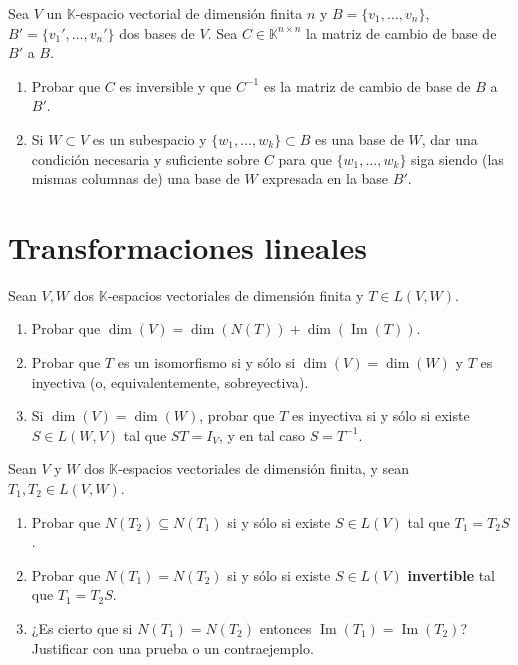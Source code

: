 \documentclass{article}
\newcommand{\K}{\mathbb{K}}
\DeclareMathOperator{\Ima}{Im}
\DeclareMathOperator{\dimm}{dim}
\theoremstyle{plain}
\theoremstyle{definition}
\theoremstyle{remark}
\newenvironment{ejercicio}[1]{\begin{trivlist}
\item[\hskip \labelsep {\bfseries Ejercicio}\hskip \labelsep {\bfseries #1.}]}{\end{trivlist}}
\begin{document}
\begin{ejercicio}{3}
    Sea \(V\) un \(\K\)-espacio vectorial de dimensión finita \(n\) y \(B = \{v_1,\ldots,v_n\}\), \(B' = \{v_1',\ldots,v_n'\}\) dos bases de \(V\). Sea \(C \in \K^{n\times n}\) la matriz de cambio de base de \(B'\) a \(B\).
    \begin{enumerate}
        \item Probar que \(C\) es inversible y que \(C^{-1}\) es la matriz de cambio de base de \(B\) a \(B'\).
        \item Si \(W \subset V\) es un subespacio y \(\{w_1,\ldots,w_k\} \subset B\) es una base de \(W\), dar una condición necesaria y suficiente sobre \(C\) para que \(\{w_1,\ldots,w_k\}\) siga siendo (las mismas columnas de) una base de \(W\) expresada en la base \(B'\).
    \end{enumerate}
\end{ejercicio}

\section{Transformaciones lineales}

\begin{ejercicio}{4}
    Sean \(V, W\) dos \(\K\)-espacios vectoriales de dimensión finita y \(T \in L(V,W)\).
    \begin{enumerate}
        \item Probar que \(\dimm(V) = \dimm(N(T)) + \dimm(\Ima(T))\).
        \item Probar que \(T\) es un isomorfismo si y sólo si \(\dimm(V) = \dimm(W)\) y \(T\) es inyectiva (o, equivalentemente, sobreyectiva).
        \item Si \(\dimm(V) = \dimm(W)\), probar que \(T\) es inyectiva si y sólo si existe \(S \in L(W,V)\) tal que \(ST = I_V\), y en tal caso \(S = T^{-1}\).
    \end{enumerate}
\end{ejercicio}

\begin{ejercicio}{5}
    Sean \(V\) y \(W\) dos \(\K\)-espacios vectoriales de dimensión finita, y sean \(T_1, T_2 \in L(V,W)\).
    \begin{enumerate}
        \item Probar que \(N(T_2) \subseteq N(T_1)\) si y sólo si existe \(S \in L(V)\) tal que \(T_1 = T_2 S\).
        \item Probar que \(N(T_1) = N(T_2)\) si y sólo si existe \(S \in L(V)\) \textbf{invertible} tal que \(T_1 = T_2 S\).
        \item ¿Es cierto que si \(N(T_1) = N(T_2)\) entonces \(\Ima(T_1) = \Ima(T_2)\)? Justificar con una prueba o un contraejemplo.
    \end{enumerate}
\end{ejercicio}
\end{document}
